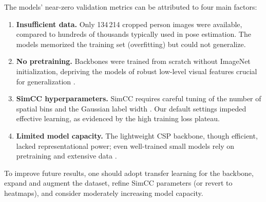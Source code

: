 The models’ near-zero validation metrics can be attributed to four main factors:
\begin{enumerate}
  \item \textbf{Insufficient data.} Only 134\,214 cropped person images were available, compared to hundreds of thousands typically used in pose estimation. The models memorized the training set (overfitting) but could not generalize.
  \item \textbf{No pretraining.} Backbones were trained from scratch without ImageNet initialization, depriving the models of robust low-level visual features crucial for generalization \cite{Mathis2021Pretraining}.
  \item \textbf{SimCC hyperparameters.} SimCC requires careful tuning of the number of spatial bins and the Gaussian label width \cite{Li2022SimCC}. Our default settings impeded effective learning, as evidenced by the high training loss plateau.
  \item \textbf{Limited model capacity.} The lightweight CSP backbone, though efficient, lacked representational power; even well-trained small models rely on pretraining and extensive data \cite{Toshev2014DeepPose}.
\end{enumerate}

To improve future results, one should adopt transfer learning for the backbone, expand and augment the dataset, refine SimCC parameters (or revert to heatmaps), and consider moderately increasing model capacity.
